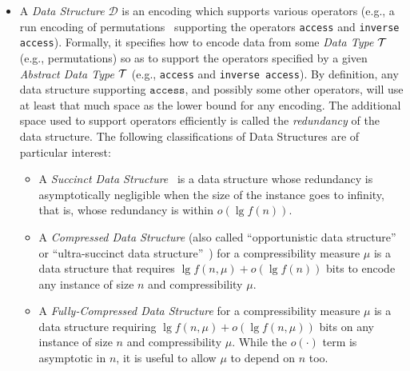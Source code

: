 \documentclass[a4paper,10pt]{article}
\newcommand{\access}{\ensuremath{\texttt{access}}}
\newcommand{\abstractDataType}{\ensuremath{{\cal T}}}
\begin{document}
\begin{itemize}

\item A \emph{Data Structure} $\mathcal{D}$ is an encoding which supports various operators (e.g., a run encoding of permutations~\cite{2013-TCS-CompressedRepresentationsOfPermutationsAndApplications-BarbayNavarro} supporting the operators \texttt{access} and \texttt{inverse access}). Formally, it specifies how to encode data from some \emph{Data Type} $\cal T$ (e.g., permutations) so as to support the operators specified by a given \emph{Abstract Data Type} {\abstractDataType} (e.g., \texttt{access} and \texttt{inverse access}).  By definition, any data structure supporting {\access}, and possibly some other operators, will use at least that much space as the lower bound for any encoding. The additional space used to support operators efficiently is called the \emph{redundancy} of the data structure. The following classifications of Data Structures are of particular interest:

\begin{itemize}
\item A \emph{Succinct Data Structure}~\cite{1989-FOCS-SpaceEfficientStaticTreesAndGraphs-Jacobson} is a data structure whose redundancy is asymptotically negligible when the size of the instance goes to infinity, that is, whose redundancy is within $o(\lg f(n))$.
\item A {\em Compressed Data Structure} (also called ``opportunistic data structure''~\cite{2004-Algoritmica-EngineeringAlightweightSuffixArrayConstructionAlgorithm-ManziniFerragina} or ``ultra-succinct data structure''~\cite{2007-SODA-UltraSuccinctRepresentationOfORderedTrees-JanssonSadakaneSung}) for a compressibility measure $\mu$ is a data structure that requires $\lg f(n,\mu) + o(\lg f(n))$ bits to encode any instance of size $n$ and compressibility $\mu$.
\item A {\em Fully-Compressed Data Structure} for a compressibility measure $\mu$ is a data structure requiring $\lg f(n,\mu) + o(\lg f(n,\mu))$ bits on any instance of size $n$ and compressibility $\mu$. While the $o(\cdot)$ term is asymptotic in $n$, it is useful to allow $\mu$ to depend on $n$ too.
\end{itemize}


\end{itemize}
\end{document}
